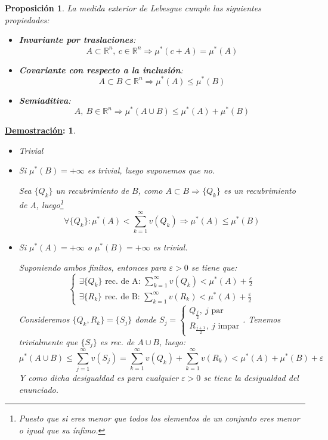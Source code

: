 \documentclass[10pt,a4paper,openright]{book}
\theoremstyle{break}
\newtheorem*{prop}{Proposición}
\newtheorem*{demo}{\underline{Demostración}:}
\begin{document}
\begin{prop}
La medida exterior de Lebesgue cumple las siguientes propiedades:
\begin{itemize}
\item \textbf{Invariante por traslaciones}:
$$A \subset \mathbb{R}^{n}, \ c \in \mathbb{R}^{n} \Rightarrow \mu^{*}\left( c + A \right) = \mu^{*}\left( A \right) $$ 
\item \textbf{Covariante con respecto a la inclusión}:
$$A \subset B \subset \mathbb{R}^{n} \Rightarrow \mu^{*}\left( A \right) \le \mu^{*}\left( B \right) $$
\item \textbf{Semiaditiva}:
$$A,\ B \in \mathbb{R}^{n} \Rightarrow \mu^{*}\left( A \cup B \right) \le \mu^{*}\left( A \right) + \mu^{*}\left( B \right)$$
\end{itemize}
\end{prop}
\begin{demo}
\begin{itemize}
\item Trivial

\item Si $\mu^{*}\left( B \right) = +\infty$ es trivial, luego suponemos que no.

Sea $\{Q_k\}$ un recubrimiento de $B$, como $A \subset B \Rightarrow \{Q_k\}$ es un recubrimiento de A, luego\footnote{Puesto que si eres menor que todos los elementos de un conjunto eres menor o igual que su ínfimo.}
$$\forall \{Q_k\}: \mu^{*}\left( A \right) < \sum_{k=1}^{\infty} v\left( Q_k \right) \Rightarrow \mu^{*}\left( A \right) \le \mu^{*}\left( B \right) $$

\item Si $\mu^{*}\left( A \right) = +\infty$ o $\mu^{*}\left( B \right) = +\infty$ es trivial. 
 
Suponiendo ambos finitos, entonces para $\varepsilon > 0$ se tiene que:
$$\begin{cases}
\exists \{Q_k\} \text{ rec. de A: } \sum_{k=1}^{\infty} v\left( Q_k \right) < \mu^{*}\left( A \right) + \frac{\varepsilon}{2}  \\
\exists \{R_k\} \text{ rec. de B: } \sum_{k=1}^{\infty} v\left( R_k \right) < \mu^{*}\left( A \right) + \frac{\varepsilon}{2} 
\end{cases}
$$
Consideremos $ \{Q_k, R_k\} = \{S_j\}$ donde $S_j = \begin{cases}
Q_{\frac{j}{2}},\ j \text{ par} \\
R_{\frac{j+1}{2}},\ j \text{ impar} 
\end{cases}$. Tenemos trivialmente que $\{S_j\}$ es rec. de $A\cup B$, luego:
$$\mu^{*}\left( A\cup B \right) \le \sum_{j=1}^{\infty} v\left( S_j \right) = \sum_{k=1}^{\infty} v\left( Q_k \right) + \sum_{k=1}^{\infty} v\left( R_k \right) < \mu^{*}\left( A \right) + \mu^{*}\left( B \right) + \varepsilon$$
Y como dicha desigualdad es para cualquier $\varepsilon > 0$ se tiene la desigualdad del enunciado.
\end{itemize}
\end{demo}
\end{document}
